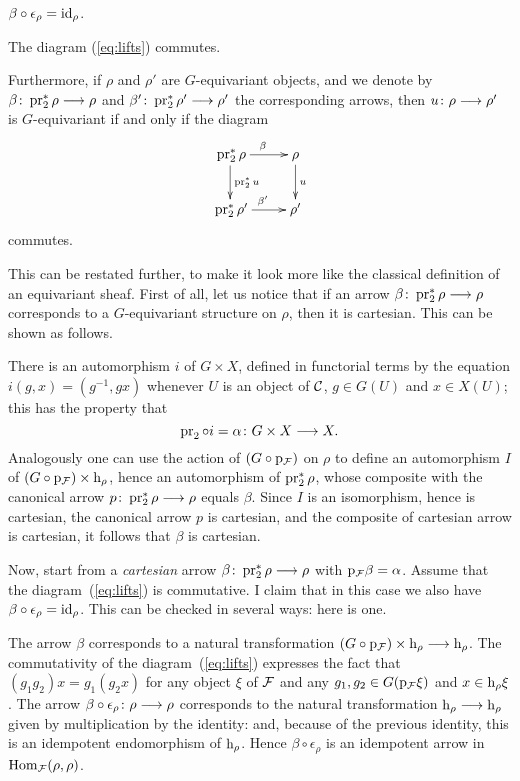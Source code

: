 \begin{3   FIBERED CATEGORIES}
\begin{3.8 Equivariant objects in fibcats}
\begin{proposition}
\begin{enumeratei}
\item $\beta \circ \epsilon_{\rho} = \mathrm{id}_{\rho}$.

\item The diagram (\ref{eq:lifts}) commutes.

\end{enumeratei}

Furthermore, if $\rho$ and $\rho'$ are $G$-equivariant objects, and we denote by $\beta \colon \pr_{2}^{*}\rho \arr \rho$ and $\beta' \colon \pr_{2}^{*}\rho' \arr \rho'$ the corresponding arrows, then $u \colon \rho \arr \rho'$ is $G$-equivariant if and only if the diagram
   \[
   \xymatrix{
   {}\pr_{2}^{*}\rho \ar[r]^{\beta} \ar[d]^{\pr_{2}^{*}u}&
   \rho              \ar[d]^{u}  \\
   {}\pr_{2}^{*}\rho' \ar[r]^{\beta'}&
   \rho'
   }
   \]
commutes.

\end{proposition}

This can be restated further, to make it look more like the classical definition of an equivariant sheaf. First of all, let us notice that if an arrow $\beta \colon \pr_2^*\rho \arr \rho$ corresponds to a $G$-equivariant structure on $\rho$, then it is cartesian. This can be shown as follows. 

There is an automorphism $i$ of $G \times X$, defined in functorial terms by the equation $i(g,x) = (g^{-1}, gx)$ whenever $U$ is an object of $\mathcal{C}$, $g \in G(U)$ and $x \in X(U)$; this has the property that 
   \[
   \pr_{2} \circ i = \alpha \colon G \times X \arr X.
   \]
Analogously one can use the action of $(G \circ \mathrm{p}_{\mathcal{F}})$ on $\rho$ to define an automorphism $I$ of $(G \circ \mathrm{p}_{\mathcal{F}}) \times \mathrm{h}_\rho$, hence an automorphism of $\operatorname{pr}_{2}^{*}\rho$, whose composite with the canonical arrow $p \colon \pr_{2}^{*}\rho \arr \rho$ equals $\beta$. Since $I$ is an isomorphism, hence is cartesian, the canonical arrow $p$ is cartesian, and the composite of cartesian arrow is cartesian, it follows that $\beta$ is cartesian.

Now, start from a \emph{cartesian} arrow $\beta \colon \pr_{2}^{*} \rho \arr \rho$ with $\mathrm{p}_{\mathcal{F}}\beta = \alpha$. Assume that the diagram~(\ref{eq:lifts}) is commutative. I claim that in this case we also have $\beta \circ \epsilon_{\rho} = \mathrm{id}_{\rho}$. This can be checked in several ways: here is one.

The arrow $\beta$ corresponds to a natural transformation $(G \circ \p_{\cF}) \times \h_{\rho} \arr \h_{\rho}$. The commutativity of the diagram~(\ref{eq:lifts}) expresses the fact that $(g_{1}g_{2})x = g_{1}(g_{2}x)$ for any object $\xi$ of $\mathcal{F}$ and any $g_{1}, g_{2} \in G(\mathrm{p}_{\mathcal{F}}\xi)$ and $x \in \mathrm{h}_{\rho}\xi$.  The arrow $\beta \circ \epsilon_{\rho} \colon \rho \arr \rho$ corresponds to the natural transformation $\h_{\rho} \arr \h_{\rho}$ given by multiplication by the identity: and, because of the previous identity, this is an idempotent endomorphism of $\mathrm{h}_{\rho}$. Hence $\beta \circ \epsilon_{\rho}$ is an idempotent arrow in $\operatorname{Hom}_{\mathcal{F}}(\rho, \rho)$.


\end{3.8 Equivariant objects in fibcats}
\end{3   FIBERED CATEGORIES}
